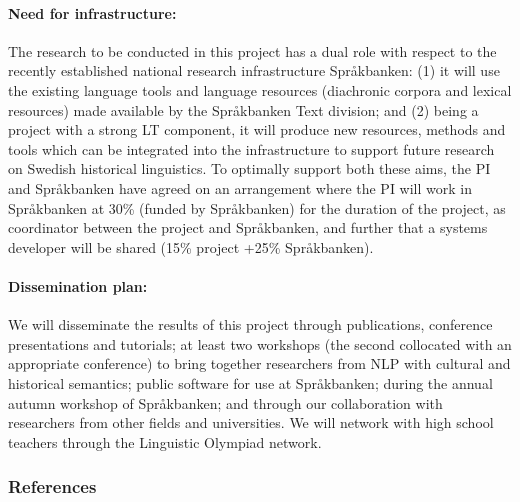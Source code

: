 \documentclass[12pt,twoside,a4paper]{article}
\newcommand{\evensmaller}{\fontsize{10.0}{10.3}\selectfont}
\begin{document}
    \paragraph{Need for infrastructure:}
The research to be conducted in this project has a dual role with respect to the recently established national research infrastructure Språkbanken:
(1) it will use the existing language tools and language resources (diachronic corpora and lexical resources) made available by the Språkbanken Text division; and
(2) being a project with a strong LT component, it will produce new resources, methods and tools which can be integrated into the infrastructure to support future research on Swedish historical linguistics.
To optimally support both these aims, the PI and Språkbanken have agreed on an arrangement where the PI will work in Språkbanken at 30\% (funded by Språkbanken) for the duration of the project, as coordinator between the project and Språkbanken, and further that a systems developer will be shared (15\% project +25\% Språkbanken). 

\vspace{-0.35cm}	
    \paragraph{Dissemination plan:}We will disseminate the results of this project through publications, conference presentations and tutorials; at least two workshops (the second collocated with an appropriate conference) to bring together researchers from NLP with cultural and historical semantics; public software for use at Språkbanken; during the annual autumn workshop of Språkbanken; and through our collaboration with researchers from other fields and universities. We will network with high school teachers through the Linguistic Olympiad network.

  \vspace{-0.2cm}  
	\subsubsection*{References}
	
	\begin{multicols}{2}
		
		\setlength{\bibsep}{0.0pt}
		{\evensmaller}
	\end{multicols}%
	
\end{document}
